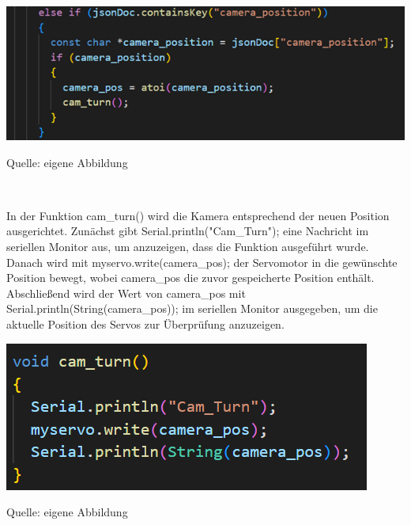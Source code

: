 \documentclass[ngerman,12pt,a4paper]{article}
\begin{document}
				\begin{center}
					\begin{minipage}[t]{\textwidth}
						\includegraphics{Pictures/camerapos}
						\label{fig:camerapos}
						\vspace{-10pt}
						\begin{center}
							\par\small Quelle: eigene Abbildung 
						\end{center}
					\end{minipage} \\[0.70cm]
				\end{center}
				In der Funktion cam\_turn() wird die Kamera entsprechend der neuen Position ausgerichtet. Zunächst gibt Serial.println("Cam\_Turn"); eine Nachricht im seriellen Monitor aus, um anzuzeigen, dass die Funktion ausgeführt wurde. Danach wird mit myservo.write(camera\_pos); der Servomotor in die gewünschte Position bewegt, wobei camera\_pos die zuvor gespeicherte Position enthält. Abschließend wird der Wert von camera\_pos mit Serial.println(String(camera\_pos)); im seriellen Monitor ausgegeben, um die aktuelle Position des Servos zur Überprüfung anzuzeigen.
				
				\begin{center}
					\begin{minipage}[t]{0.7\textwidth}
						\includegraphics{Pictures/camturn}
						\label{fig:camturn}
						\vspace{-10pt}
						\begin{center}
							\par\small Quelle: eigene Abbildung 
						\end{center}
					\end{minipage} \\[0.70cm]
				\end{center}
				\newpage
\end{document}
